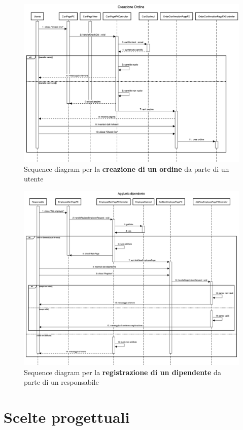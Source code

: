 \documentclass[12pt,a4paper]{article}
\begin{document}
	\begin{figure}[h!]
		\centering
		\includegraphics[scale=0.35]{images/SequenceDiagrams/CreazioneOrdine.png}
		\caption{Sequence diagram per la \textbf{creazione di un ordine} da parte di un utente}
	\end{figure}
	\newpage
	\begin{figure}[h!]
		\centering
		\includegraphics[scale=0.32]{images/SequenceDiagrams/AggiuntaEmployee.png}
		\caption{Sequence diagram per la \textbf{registrazione di un dipendente} da parte di un responsabile}
	\end{figure}
	\newpage
	\section{Scelte progettuali}
\end{document}
